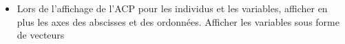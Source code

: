 \documentclass[
]{article}
\newenvironment{Shaded}{\begin{snugshade}}{\end{snugshade}}
\newcommand{\ControlFlowTok}[1]{\textcolor[rgb]{0.13,0.29,0.53}{\textbf{#1}}}
\newcommand{\DecValTok}[1]{\textcolor[rgb]{0.00,0.00,0.81}{#1}}
\newcommand{\FunctionTok}[1]{\textcolor[rgb]{0.00,0.00,0.00}{#1}}
\newcommand{\NormalTok}[1]{#1}
\newcommand{\OtherTok}[1]{\textcolor[rgb]{0.56,0.35,0.01}{#1}}
\newcommand{\SpecialCharTok}[1]{\textcolor[rgb]{0.00,0.00,0.00}{#1}}
\newcommand{\StringTok}[1]{\textcolor[rgb]{0.31,0.60,0.02}{#1}}
\providecommand{\tightlist}{%
  \setlength{\itemsep}{0pt}\setlength{\parskip}{0pt}}
\begin{document}
\begin{itemize}
\tightlist
\item
  Lors de l'affichage de l'ACP pour les individus et les variables,
  afficher en plus les axes des abscisses et des ordonnées. Afficher les
  variables sous forme de vecteurs
\end{itemize}

\begin{Shaded}
\end{Shaded}
\end{document}
